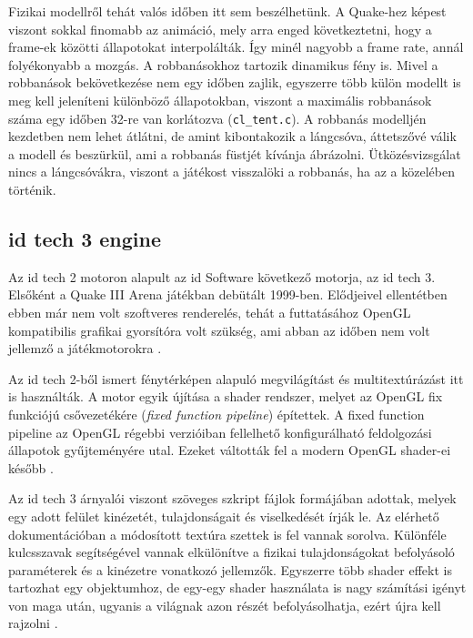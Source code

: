 Fizikai modellről tehát valós időben itt sem beszélhetünk. A Quake-hez képest viszont sokkal finomabb az animáció, mely arra enged következtetni, hogy a frame-ek közötti állapotokat interpolálták. Így minél nagyobb a frame rate, annál folyékonyabb a mozgás. A robbanásokhoz tartozik dinamikus fény is. Mivel a robbanások bekövetkezése nem egy időben zajlik, egyszerre több külön modellt is meg kell jeleníteni különböző állapotokban, viszont a maximális robbanások száma egy időben 32-re van korlátozva (\texttt{cl\_tent.c}). A robbanás modelljén kezdetben nem lehet átlátni, de amint kibontakozik a lángcsóva, áttetszővé válik a modell és beszürkül, ami a robbanás füstjét kívánja ábrázolni. Ütközésvizsgálat nincs a lángcsóvákra, viszont a játékost visszalöki a robbanás, ha az a közelében történik. 

\subsection{id tech 3 engine}

Az id tech 2 motoron alapult az id Software következő motorja, az id tech 3. Elsőként a Quake III Arena játékban debütált 1999-ben. Elődjeivel ellentétben ebben már nem volt szoftveres renderelés, tehát a futtatásához OpenGL kompatibilis grafikai gyorsítóra volt szükség, ami abban az időben nem volt jellemző a játékmotorokra \cite{wikiQuake3}.


Az id tech 2-ből ismert fénytérképen alapuló megvilágítást és multitextúrázást itt is használták. A motor egyik újítása a shader rendszer, melyet az OpenGL fix funkciójú csővezetékére (\textit{fixed function pipeline}) építettek. A fixed function pipeline az OpenGL régebbi verzióiban fellelhető konfigurálható feldolgozási állapotok gyűjteményére utal. Ezeket váltották fel a modern OpenGL shader-ei később \cite{fsQuake3}.

Az id tech 3 árnyalói viszont szöveges szkript fájlok formájában adottak, melyek egy adott felület kinézetét, tulajdonságait és viselkedését írják le. Az elérhető dokumentációban a módosított textúra szettek is fel vannak sorolva. Különféle kulcsszavak segítségével vannak elkülönítve a fizikai tulajdonságokat befolyásoló paraméterek és a kinézetre vonatkozó jellemzők. Egyszerre több shader effekt is tartozhat egy objektumhoz, de egy-egy shader használata is nagy számítási igényt von maga után, ugyanis a világnak azon részét befolyásolhatja, ezért újra kell rajzolni \cite{quake3shaderManual}.

